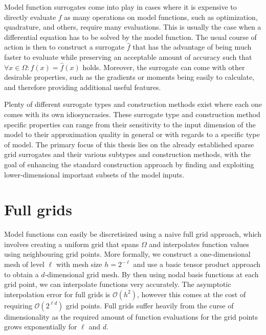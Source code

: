 \documentclass[
  a4paper,  %
  twoside,  %
  bibliography=totoc,
  headsepline,
  cleardoublepage=empty,
  parskip=half,
  draft=false
]{scrbook}
\begin{document}
Model function surrogates come into play in cases where it is expensive to directly evaluate $f$ as many operations on model functions, such as optimization, quadrature, and others, require many evaluations.
This is usually the case when a differential equation has to be solved by the model function.
The usual course of action is then to construct a surrogate $\hat{f}$ that has the advantage of being much faster to evaluate while preserving an acceptable amount of accuracy such that $\forall x \in \Omega \colon f(x)=\hat{f}(x)$ holds.
Moreover, the surrogate can come with other desirable properties, such as the gradients or moments being easily to calculate, and therefore providing additional useful features.

Plenty of different surrogate types and construction methods exist where each one comes with its own idiosyncrasies.
These surrogate type and construction method specific properties can range from their sensitivity to the input dimension of the model to their approximation quality in general or with regards to a specific type of model. 
The primary focus of this thesis lies on the already established sparse grid surrogates \cite{} and their various subtypes and construction methods, with the goal of enhancing the standard construction approach by finding and exploiting lower-dimensional important subsets of the model inputs.

\section{Full grids}

Model functions can easily be discretisized using a naive full grid approach, which involves creating a uniform grid that spans $\Omega$ and interpolates function values using neighbouring grid points.
More formally, we construct a one-dimensional mesh of level $\ell$ with mesh size $h=2^{-\ell}$ and use a basic tensor product approach to obtain a $d$-dimensional grid mesh.
By then using nodal basis functions at each grid point, we can interpolate functions very accurately.
The asymptotic interpolation error for full grids is $\mathcal{O}(h^2)$, however this comes at the cost of requiring $\mathcal{O}(2^{\ell d})$ grid points.
Full grids suffer heavily from the curse of dimensionality as the required amount of function evaluations for the grid points grows exponentially for $\ell$ and $d$.
\end{document}
